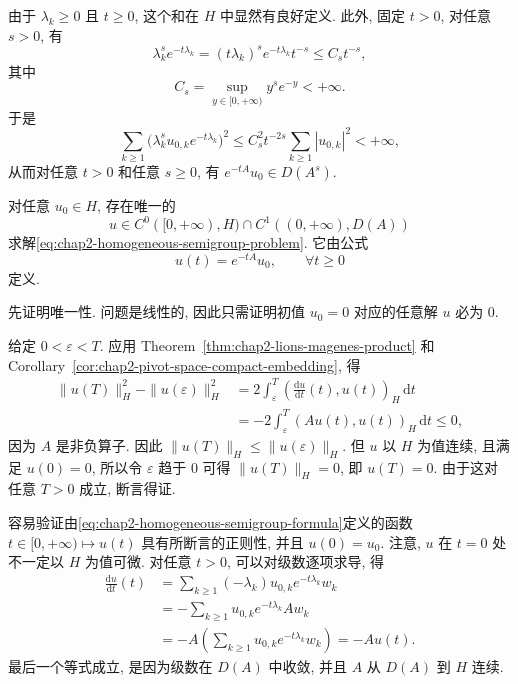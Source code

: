 \begin{Proof}
由于 $\lambda_k\geq0$ 且 $t\geq0$, 这个和在 $H$ 中显然有良好定义. 此外, 固定 $t>0$, 对任意 $s>0$, 有
\[
 \lambda_k^se^{-t\lambda_k}=(t\lambda_k)^se^{-t\lambda_k}t^{-s}
 \leq C_st^{-s},
\]
其中
\[
 C_s=\sup_{y\in[0,+\infty)}y^se^{-y}<+\infty.
\]
于是
\[
 \sum_{k\geq1}\bigl(\lambda_k^su_{0,k}e^{-t\lambda_k}\bigr)^2
 \leq C_s^2t^{-2s}\sum_{k\geq1}|u_{0,k}|^2<+\infty,
\]
从而对任意 $t>0$ 和任意 $s\geq0$, 有 $e^{-tA}u_0\in D(A^s)$.
\end{Proof}

\begin{Theorem}
\label{thm:chap2-homogeneous-semigroup-solution}
对任意 $u_0\in H$, 存在唯一的
\[
 u\in C^0([0,+\infty),H)\cap C^1((0,+\infty),D(A))
\]
求解\eqref{eq:chap2-homogeneous-semigroup-problem}. 它由公式
\begin{equation}
 u(t)=e^{-tA}u_0,
 \qquad\forall t\geq0
 \label{eq:chap2-homogeneous-semigroup-formula}
\end{equation}
定义.
\end{Theorem}

\begin{Proof}
先证明唯一性. 问题是线性的, 因此只需证明初值 $u_0=0$ 对应的任意解 $u$ 必为 $0$.

给定 $0<\varepsilon<T$. 应用 Theorem~\ref{thm:chap2-lions-magenes-product} 和 Corollary~\ref{cor:chap2-pivot-space-compact-embedding}, 得
\[
\begin{aligned}
 \|u(T)\|_H^2-\|u(\varepsilon)\|_H^2
 &=2\int_\varepsilon^T\left(\frac{\mathrm du}{\mathrm dt}(t),u(t)\right)_H\,\mathrm dt\\
 &=-2\int_\varepsilon^T(Au(t),u(t))_H\,\mathrm dt\leq0,
\end{aligned}
\]
因为 $A$ 是非负算子. 因此 $\|u(T)\|_H\leq\|u(\varepsilon)\|_H$. 但 $u$ 以 $H$ 为值连续, 且满足 $u(0)=0$, 所以令 $\varepsilon$ 趋于 $0$ 可得 $\|u(T)\|_H=0$, 即 $u(T)=0$. 由于这对任意 $T>0$ 成立, 断言得证.

容易验证由\eqref{eq:chap2-homogeneous-semigroup-formula}定义的函数 $t\in[0,+\infty)\mapsto u(t)$ 具有所断言的正则性, 并且 $u(0)=u_0$. 注意, $u$ 在 $t=0$ 处不一定以 $H$ 为值可微. 对任意 $t>0$, 可以对级数逐项求导, 得
\[
\begin{aligned}
 \frac{\mathrm du}{\mathrm dt}(t)
 &=\sum_{k\geq1}(-\lambda_k)u_{0,k}e^{-t\lambda_k}w_k\\
 &=-\sum_{k\geq1}u_{0,k}e^{-t\lambda_k}Aw_k\\
 &=-A\left(\sum_{k\geq1}u_{0,k}e^{-t\lambda_k}w_k\right)
 =-Au(t).
\end{aligned}
\]
最后一个等式成立, 是因为级数在 $D(A)$ 中收敛, 并且 $A$ 从 $D(A)$ 到 $H$ 连续.
\end{Proof}

